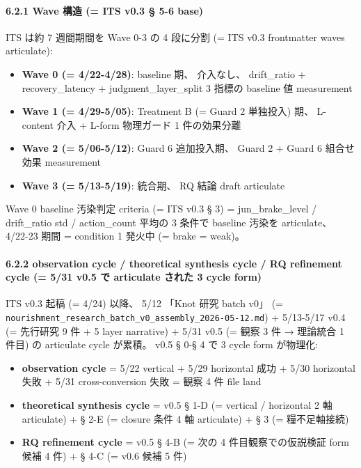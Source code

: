 \documentclass[
]{article}
\providecommand{\tightlist}{%
  \setlength{\itemsep}{0pt}\setlength{\parskip}{0pt}}
\begin{document}
\paragraph{6.2.1 Wave 構造 (= ITS v0.3 § 5-6
base)}\label{wave-ux69cbux9020-its-v0.3-5-6-base}

ITS は約 7 週間期間を Wave 0-3 の 4 段に分割 (= ITS v0.3 frontmatter
waves articulate):

\begin{itemize}
\tightlist
\item
  \textbf{Wave 0 (= 4/22-4/28)}: baseline 期、 介入なし、 drift\_ratio +
  recovery\_latency + judgment\_layer\_split 3 指標の baseline 値
  measurement
\item
  \textbf{Wave 1 (= 4/29-5/05)}: Treatment B (= Guard 2 単独投入) 期、
  L-content 介入 + L-form 物理ガード 1 件の効果分離
\item
  \textbf{Wave 2 (= 5/06-5/12)}: Guard 6 追加投入期、 Guard 2 + Guard 6
  組合せ効果 measurement
\item
  \textbf{Wave 3 (= 5/13-5/19)}: 統合期、 RQ 結論 draft articulate
\end{itemize}

Wave 0 baseline 汚染判定 criteria (= ITS v0.3 § 3) = jun\_brake\_level /
drift\_ratio std / action\_count 平均の 3 条件で baseline 汚染を
articulate、 4/22-23 期間 = condition 1 発火中 (= brake = weak)。

\paragraph{6.2.2 observation cycle / theoretical synthesis cycle / RQ
refinement cycle (= 5/31 v0.5 で articulate された 3 cycle
form)}\label{observation-cycle-theoretical-synthesis-cycle-rq-refinement-cycle-531-v0.5-ux3067-articulate-ux3055ux308cux305f-3-cycle-form}

ITS v0.3 起稿 (= 4/24) 以降、 5/12 「Knot 研究 batch v0」 (=
\texttt{nourishment\_research\_batch\_v0\_assembly\_2026-05-12.md}) +
5/13-5/17 v0.4 (= 先行研究 9 件 + 5 layer narrative) + 5/31 v0.5 (= 観察
3 件 → 理論統合 1 件目) の articulate cycle が累積。 v0.5 § 0-§ 4 で 3
cycle form が物理化:

\begin{itemize}
\tightlist
\item
  \textbf{observation cycle} = 5/22 vertical + 5/29 horizontal 成功 +
  5/30 horizontal 失敗 + 5/31 cross-conversion 失敗 = 観察 4 件 file
  land
\item
  \textbf{theoretical synthesis cycle} = v0.5 § 1-D (= vertical /
  horizontal 2 軸 articulate) + § 2-E (= closure 条件 4 軸 articulate) +
  § 3 (= 糧不足軸接続)
\item
  \textbf{RQ refinement cycle} = v0.5 § 4-B (= 次の 4
  件目観察での仮説検証 form 候補 4 件) + § 4-C (= v0.6 候補 5 件)
\end{itemize}
\end{document}
